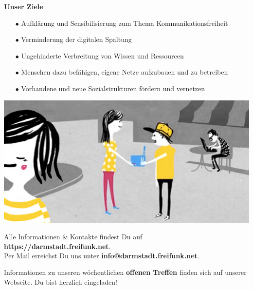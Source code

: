 \documentclass[a4paper]{article}
\begin{document}
\begin{Row}
  \begin{Cell}{5}
    \textbf{Unser Ziele}\vspace*{-0.35cm}
		\begin{itemize}
			\setlength{\itemindent}{0.5em}
			\item[\textcolor{freifunkpink}{\Large$\bullet$}] Aufklärung und Sensibilisierung zum Thema Kommunikationsfreiheit\vspace*{-0.3cm}
			\item[\textcolor{freifunkpink}{\Large$\bullet$}] Verminderung der digitalen Spaltung\vspace*{-0.3cm}
			\item[\textcolor{freifunkpink}{\Large$\bullet$}] Ungehinderte Verbreitung von Wissen und Ressourcen\vspace*{-0.3cm}
			\item[\textcolor{freifunkpink}{\Large$\bullet$}] Menschen dazu befähigen, eigene Netze aufzubauen und zu betreiben\vspace*{-0.3cm}
			\item[\textcolor{freifunkpink}{\Large$\bullet$}] Vorhandene und neue Sozialstrukturen fördern und vernetzen\vspace*{-0.3cm}
		\end{itemize}
  \end{Cell}
\end{Row}


\begin{center}
	\vspace{.3cm}
	\hspace*{-0.05 \paperwidth}\includegraphics[width=\paperwidth]{../images/community_router}
\end{center}

Alle Informationen \& Kontakte findest Du auf \textbf{https://darmstadt.freifunk.net}.\\
Per Mail erreichst Du uns unter \textbf{info@darmstadt.freifunk.net}.

Informationen zu unseren wöchentlichen \textbf{offenen Treffen} finden sich auf unserer Webseite. Du bist herzlich eingeladen!
\end{document}
